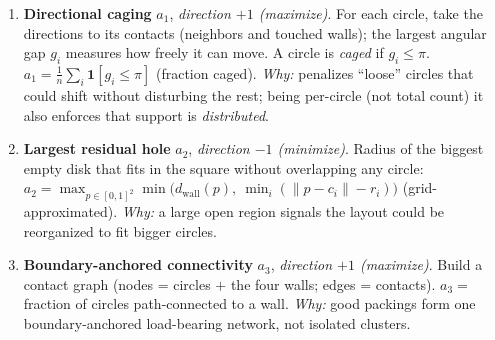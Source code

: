 \documentclass[11pt]{article}
\begin{document}
\begin{enumerate}[leftmargin=1.4em]
  \item \textbf{Directional caging} $a_1$, \emph{direction $+1$ (maximize)}.
        For each circle, take the directions to its contacts (neighbors and touched walls); the
        largest angular gap $g_i$ measures how freely it can move. A circle is \emph{caged} if
        $g_i\le\pi$. $a_1 = \frac1n\sum_i \mathbf{1}[g_i\le\pi]$ (fraction caged).
        \emph{Why:} penalizes ``loose'' circles that could shift without disturbing the rest; being
        per-circle (not total count) it also enforces that support is \emph{distributed}.
  \item \textbf{Largest residual hole} $a_2$, \emph{direction $-1$ (minimize)}.
        Radius of the biggest empty disk that fits in the square without overlapping any circle:
        $a_2=\max_{p\in[0,1]^2}\min\big(d_{\text{wall}}(p),\ \min_i(\lVert p-c_i\rVert-r_i)\big)$
        (grid-approximated).
        \emph{Why:} a large open region signals the layout could be reorganized to fit bigger circles.
  \item \textbf{Boundary-anchored connectivity} $a_3$, \emph{direction $+1$ (maximize)}.
        Build a contact graph (nodes = circles $+$ the four walls; edges = contacts). $a_3 =$
        fraction of circles path-connected to a wall.
        \emph{Why:} good packings form one boundary-anchored load-bearing network, not isolated
        clusters.
\end{enumerate}
\end{document}
